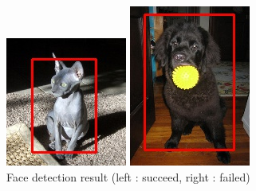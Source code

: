 \documentclass[conference,compsoc]{IEEEtran}
\begin{document}
\begin{figure}
\begin{multicols}{4}
    		\includegraphics[height=1.2\linewidth]{badFace.jpg}\par
    		\includegraphics[height=1.2\linewidth]{badFace2.jpg}\par
	\end{multicols}
	\caption{Face detection result (left : succeed, right : failed)}
\end{figure}
\end{document}
